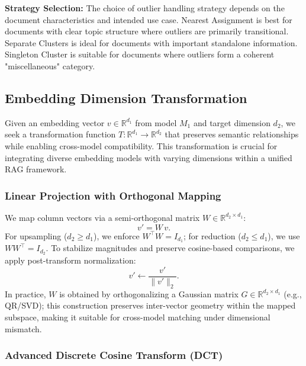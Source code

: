 \documentclass[10pt,twocolumn,letterpaper]{article}
\begin{document}
\vspace{0.5em}
\textbf{Strategy Selection:} The choice of outlier handling strategy depends on the document characteristics and intended use case. Nearest Assignment is best for documents with clear topic structure where outliers are primarily transitional. Separate Clusters is ideal for documents with important standalone information. Singleton Cluster is suitable for documents where outliers form a coherent "miscellaneous" category. 

\subsection{Embedding Dimension Transformation}

Given an embedding vector $v \in \mathbb{R}^{d_1}$ from model $M_1$ and target dimension $d_2$, we seek a transformation function $T: \mathbb{R}^{d_1} \rightarrow \mathbb{R}^{d_2}$ that preserves semantic relationships while enabling cross-model compatibility. This transformation is crucial for integrating diverse embedding models with varying dimensions within a unified RAG framework.


\subsubsection{Linear Projection with Orthogonal Mapping}

We map column vectors via a semi-orthogonal matrix $W \in \mathbb{R}^{d_2 \times d_1}$:
\begin{equation}
v' = W\,v.
\end{equation}
For upsampling ($d_2 \ge d_1$), we enforce $W^\top W = I_{d_1}$; for reduction ($d_2 \le d_1$), we use $W W^\top = I_{d_2}$. To stabilize magnitudes and preserve cosine-based comparisons, we apply post-transform normalization:
\begin{equation}
v' \leftarrow \frac{v'}{\lVert v' \rVert_2}.
\end{equation}
In practice, $W$ is obtained by orthogonalizing a Gaussian matrix $G \in \mathbb{R}^{d_2 \times d_1}$ (e.g., QR/SVD); this construction preserves inter-vector geometry within the mapped subspace, making it suitable for cross-model matching under dimensional mismatch.

\subsubsection{Advanced Discrete Cosine Transform (DCT)}
\end{document}
